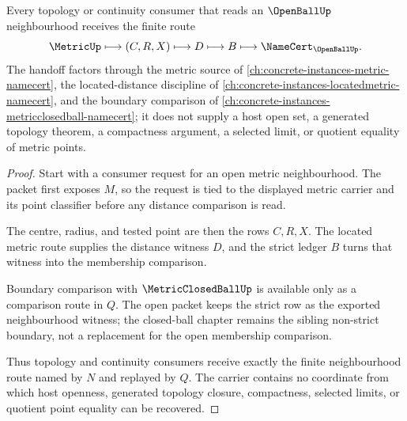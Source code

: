 \begin{theorem}
\label{thm:open-ball-metric-neighborhood-handoff}
Every topology or continuity consumer that reads an $\OpenBallUp$ neighbourhood receives the finite route
$$
\MetricUp \longmapsto (C,R,X) \longmapsto D \longmapsto B \longmapsto \NameCert_{\OpenBallUp}.
$$
The handoff factors through the metric source of \autoref{ch:concrete-instances-metric-namecert}, the located-distance discipline of \autoref{ch:concrete-instances-locatedmetric-namecert}, and the boundary comparison of \autoref{ch:concrete-instances-metricclosedball-namecert}; it does not supply a host open set, a generated topology theorem, a compactness argument, a selected limit, or quotient equality of metric points.
\end{theorem}
\begin{proof}
Start with a consumer request for an open metric neighbourhood. The packet first exposes $M$, so the request is tied to the displayed metric carrier and its point classifier before any distance comparison is read.

The centre, radius, and tested point are then the rows $C,R,X$. The located metric route supplies the distance witness $D$, and the strict ledger $B$ turns that witness into the membership comparison.

Boundary comparison with $\MetricClosedBallUp$ is available only as a comparison route in $Q$. The open packet keeps the strict row as the exported neighbourhood witness; the closed-ball chapter remains the sibling non-strict boundary, not a replacement for the open membership comparison.

Thus topology and continuity consumers receive exactly the finite neighbourhood route named by $N$ and replayed by $Q$. The carrier contains no coordinate from which host openness, generated topology closure, compactness, selected limits, or quotient point equality can be recovered.
\end{proof}

